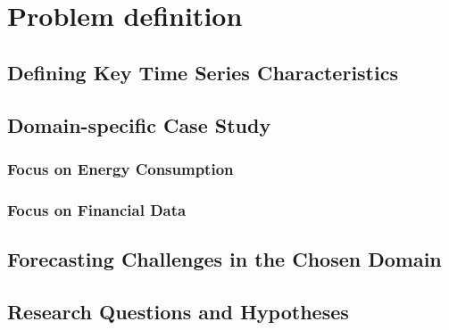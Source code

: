 \chapter{Problem definition}

\section{Defining Key Time Series Characteristics} %

\section{Domain-specific Case Study} %
\subsection{Focus on Energy Consumption} %

\subsection{Focus on Financial Data} %

\section{Forecasting Challenges in the Chosen Domain} %

\section{Research Questions and Hypotheses} %
